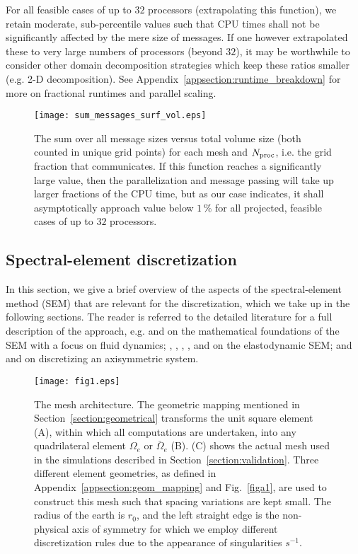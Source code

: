 For all feasible cases of up to $32$ processors (extrapolating this function), 
we retain moderate, sub-percentile values such that CPU times shall not be 
significantly affected by the mere size of messages.
If one however extrapolated these to very large numbers of processors (beyond $32$), 
it may be worthwhile to consider other domain decomposition strategies 
which keep these ratios smaller (e.g. 2-D decomposition).
See Appendix~\ref{appsection:runtime_breakdown}
for more on fractional runtimes and parallel scaling.
%
\begin{figure}[t!]
\begin{center}
\texttt{[image: sum\_messages\_surf\_vol.eps]}
\caption{The sum over all message sizes versus total volume size 
(both counted in unique grid points) for each mesh and $N_{\rm proc}$, 
i.e. the grid fraction that communicates. 
If this function reaches a significantly large value, then the 
parallelization and message passing will take up larger fractions 
of the CPU time, but as our case indicates, it shall asymptotically 
approach value below $1\,\%$ for all projected, feasible cases of 
up to $32$ processors. }
\label{img:message_surf_vol}
\end{center}
\end{figure}
%
%
\subsection{Spectral-element discretization}
In this section, we give a brief overview of the aspects of the 
spectral-element method (SEM) that are relevant for the discretization, 
which we take up in the following sections. 
The reader is referred to the detailed literature
for a full description of the approach, e.g. \citet{dfm} and 
\citet{karniadakis} 
on the mathematical foundations of the SEM with a focus on fluid dynamics; 
\citet{KoVi98}, \citet{KoTr99}, \citet{KoTr02a}, \citet{manu03}, and 
\citet{Chaljub+:06} on the 
elastodynamic SEM; and \citet{bernardi} and \citet{fournier04} on 
discretizing an axisymmetric system.
%
%
\begin{figure}[htb!]
\begin{center}
\texttt{[image: fig1.eps]}
\caption{The mesh architecture. The geometric mapping mentioned in 
Section~\ref{section:geometrical} transforms the unit square element (A), 
within which all computations are undertaken, into any quadrilateral element 
$\Omega_e$ or $\bar{\Omega}_e$ (B). (C) shows the actual mesh used 
in the simulations described in Section~\ref{section:validation}. 
Three different element geometries, as defined in 
Appendix~\ref{appsection:geom_mapping} and 
Fig.~\ref{figa1}, are used to construct this mesh such that spacing 
variations are kept small. The radius of the earth is $r_0$, and 
the left straight edge is the non-physical axis of 
symmetry for which we employ different discretization rules due to the 
appearance of singularities $s^{-1}$.}
\label{fig1}
\end{center}
\end{figure}
%
